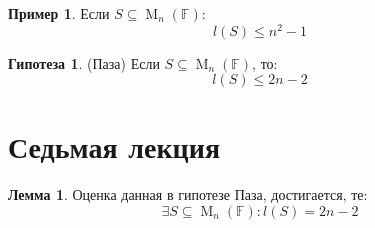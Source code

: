 \documentclass[a4paper, 14pt]{extarticle}
\theoremstyle{definition}
\newtheorem{lemma}{Лемма}
\newtheorem{example}{Пример}
\newtheorem{hypot}{Гипотеза}
\begin{document}
\begin{example}
	Если \(S \subseteq \operatorname{M}_n(\mathbb{F}):\) \[l(S) \leqslant n^2 - 1\]
\end{example}

\begin{hypot}
	(Паза) Если \(S \subseteq \operatorname{M}_n(\mathbb{F})\), то: \[l(S) \leqslant 2n - 2\]
\end{hypot}

\newpage

\section{Седьмая лекция}

\begin{lemma}
	Оценка данная в гипотезе Паза, достигается, те:
	\[\exists S \subseteq \operatorname{M}_n(\mathbb{F}) : l(S) = 2n - 2\]
\end{lemma}
\end{document}
